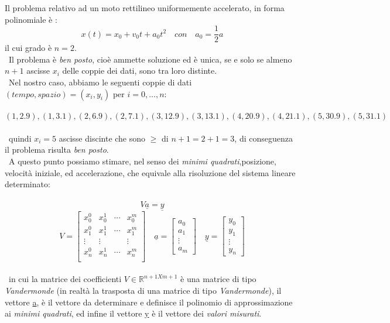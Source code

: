 Il problema relativo ad un moto rettilineo uniformemente accelerato, in forma polinomiale è :
	\[
		x(t) = x_0 + v_0t + a_0t^2 \quad con \quad a_0 = \frac{1}{2}a
	\]
il cui grado è $n=2$.\\\
Il problema è \textit{ben posto}, cioè ammette soluzione ed è unica, se e solo se almeno $n+1$ ascisse $x_i$ delle coppie dei dati, sono tra loro distinte.\\\
Nel nostro caso, abbiamo le seguenti coppie di dati $(tempo, spazio)=(x_i,y_i)$ per $i=0,...,n$:\\\
	\[
		(1,2.9),(1,3.1),(2,6.9),(2,7.1),(3,12.9),(3,13.1),(4,20.9),(4,21.1),(5,30.9),(5,31.1)	
	\]\\\
quindi $x_i=5$ ascisse discinte che sono $\geq$ di $n+1 = 2+1 = 3$, di conseguenza il problema risulta \textit{ben posto}.\\\
A questo punto possiamo stimare, nel senso dei \textit{minimi quadrati},posizione, velocità iniziale, ed accelerazione, che equivale alla risoluzione del sistema lineare determinato:\\\
	\[
		V\underline{a}=\underline{y}
	\]
	\[
		V=\begin{bmatrix}
			x_0^0 & x_0^1 & \cdots & x_0^m \\
			x_1^0 & x_1^1 & \cdots & x_1^m \\
			\vdots & \vdots & & \vdots \\
			x_n^0 & x_n^1 & \cdots & x_n^m \\		
		\end{bmatrix}
		\quad
		\underline{a}=\begin{bmatrix}
			a_0 \\
			a_1 \\
			\vdots \\
			a_m
		\end{bmatrix}
		\quad
		\underline{y}=\begin{bmatrix}
			y_0 \\
			y_1 \\
			\vdots \\
			y_n
		\end{bmatrix}
	\]\\\
in cui la matrice dei coefficienti $V \in \mathbb{R}^{n+1Xm+1}$ è una matrice di tipo \textit{Vandermonde} (in realtà la trasposta di una matrice di tipo \textit{Vandermonde}), il vettore \underline{a}, è il vettore  da determinare e definisce il polinomio di approssimazione ai \textit{minimi quadrati}, ed infine il vettore \underline{y} è il vettore dei \textit{valori misurati}.\\\
